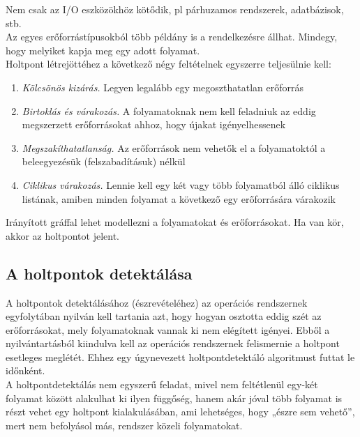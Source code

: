 \documentclass[tikz,12pt,margin=0px]{article}
\begin{document}
    \noindent Nem csak az I/O eszközökhöz kötődik, pl párhuzamos rendszerek, adatbázisok, stb. \\

    \noindent Az egyes erőforrástípusokból több példány is a rendelkezésre állhat. Mindegy, hogy melyiket kapja meg egy adott folyamat.\\

	\noindent Holtpont létrejöttéhez a következő négy feltételnek egyszerre teljesülnie kell:

	\begin{enumerate}[topsep=8pt,itemsep=4pt,partopsep=4pt, parsep=4pt]
		\item \textit{Kölcsönös kizárás.} Legyen legalább egy megoszthatatlan erőforrás
		\item \textit{Birtoklás és várakozás.} A folyamatoknak nem kell feladniuk az eddig megszerzett erőforrásokat ahhoz, hogy újakat igényelhessenek
		\item \textit{Megszakíthatatlanság.} Az erőforrások nem vehetők el a folyamatoktól a beleegyezésük (felszabadításuk) nélkül
		\item \textit{Ciklikus várakozás.} Lennie kell egy két vagy több folyamatból álló ciklikus listának, amiben minden folyamat a következő egy erőforrására várakozik
	\end{enumerate}

	\noindent Irányított gráffal lehet modellezni a folyamatokat és erőforrásokat. Ha van kör, akkor az holtpontot jelent. \\

    \subsection*{A holtpontok detektálása }

    A holtpontok detektálásához (észrevételéhez) az operációs rendszernek egyfolytában nyilván kell tartania azt, hogy hogyan osztotta eddig szét az erőforrásokat, mely folyamatoknak vannak ki nem elégített igényei. Ebből a nyilvántartásból kiindulva kell az operációs rendszernek felismernie a holtpont esetleges meglétét. Ehhez egy úgynevezett holtpontdetektáló algoritmust futtat le időnként.\\

    \noindent A holtpontdetektálás nem egyszerű feladat, mivel nem feltétlenül egy-két folyamat között alakulhat ki ilyen függőség, hanem akár jóval több folyamat is részt vehet egy holtpont kialakulásában, ami lehetséges, hogy „észre sem vehető”, mert nem befolyásol más, rendszer közeli folyamatokat.
\end{document}

